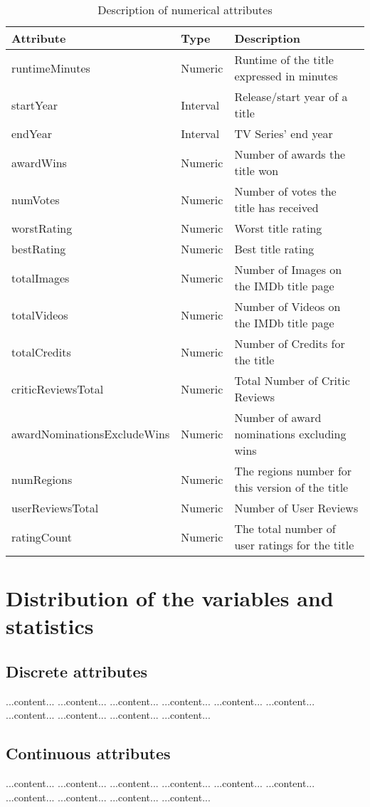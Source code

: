 \begin{table}[h]
    \centering
    \begin{tabular}{|l|l|l|} %
        \hline
        \textbf{Attribute} & \textbf{Type} & \textbf{Description} \\ 
        \hline
        runtimeMinutes & Numeric & Runtime of the title expressed in minutes \\ 
        \hline
        startYear & Interval & Release/start year of a title \\ 
        \hline
        endYear & Interval & TV Series' end year \\
        \hline
        awardWins & Numeric & Number of awards the title won \\ 
        \hline
        numVotes & Numeric & Number of votes the title has received \\ 
        \hline
        worstRating & Numeric & Worst title rating \\ 
        \hline
        bestRating & Numeric & Best title rating \\ 
        \hline
        totalImages & Numeric & Number of Images on the IMDb title page \\ 
        \hline
        totalVideos & Numeric & Number of Videos on the IMDb title page \\ 
        \hline
        totalCredits & Numeric & Number of Credits for the title \\ 
        \hline
        criticReviewsTotal & Numeric & Total Number of Critic Reviews \\ 
        \hline
        awardNominationsExcludeWins & Numeric & Number of award nominations excluding wins \\ 
        \hline
        numRegions & Numeric & The regions number for this version of the title \\ 
        \hline
        userReviewsTotal & Numeric & Number of User Reviews \\ 
        \hline
        ratingCount & Numeric & The total number of user ratings for the title \\ 
        \hline
    \end{tabular}
    \caption{Description of numerical attributes}
    \label{tab:numerical_attributes}
\end{table}
\section{Distribution of the variables and statistics}\label{sec:variable_distrib}
\subsection{Discrete attributes}
...content...
...content...
...content...
...content...
...content...
...content...
...content...
...content...
...content...
...content...

\subsection{Continuous attributes}
...content...
...content...
...content...
...content...
...content...
...content...
...content...
...content...
...content...
...content...